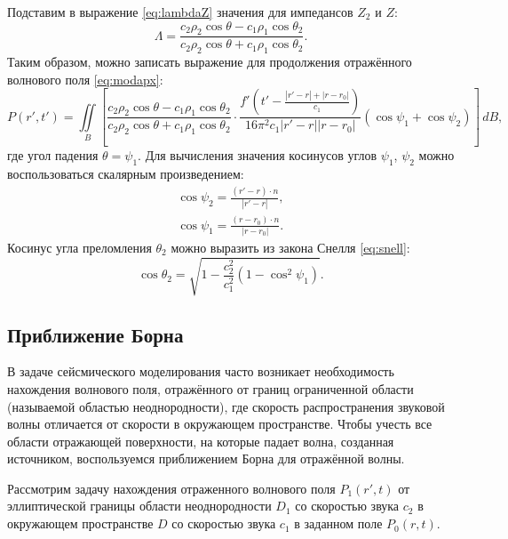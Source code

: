 \documentclass[a4paper, fontsize=14pt]{article}
\begin{document}
	Подставим в выражение \eqref{eq:lambdaZ} значения для импедансов $Z_2$ и $Z$:
	\begin{equation}
		\Lambda = \frac{c_2 \rho_2 \cos \theta - c_1 \rho_1 \cos \theta_2}{c_2 \rho_2 \cos \theta + c_1 \rho_1 \cos \theta_2}.
		\label{eq:lambda}
	\end{equation}
	Таким образом, можно записать выражение для продолжения отражённого волнового поля \eqref{eq:modapx}:
	\begin{equation}
		P(r',t') = \iint\limits_{B} \left[ \frac{c_2 \rho_2 \cos \theta - c_1 \rho_1 \cos \theta_2}{c_2 \rho_2 \cos \theta + c_1 \rho_1 \cos \theta_2} \cdot \frac{f'\left(t'-\frac{|r'-r|+|r-r_0|}{c_1}\right) }{16\pi^2c_1|r'-r||r-r_0|} (\cos \psi_1 + \cos \psi_2) \right] \,dB,
	\end{equation}
	где угол падения $\theta=\psi_1$.
	Для вычисления значения косинусов углов $\psi_1$, $\psi_2$ можно воспользоваться скалярным произведением:
	\begin{gather}
		\cos \psi_2=\frac{(r'-r)\cdot n }{|r'-r|}, \\
		\cos \psi_1 = \frac{(r-r_0)\cdot n }{|r-r_0|}.  \label{eq:cosincident}
	\end{gather}
	Косинус угла преломления $\theta_2$ можно выразить из закона Снелля \eqref{eq:snell}:
	\begin{equation}
		\cos \theta_2 =  \sqrt{1-\frac{c_2^2}{c_1^2}(1-\cos^2 \psi_1)}.
	\end{equation}


	
	

	
	\subsection{Приближение Борна}
	В задаче сейсмического моделирования часто возникает необходимость нахождения волнового поля, отражённого от границ ограниченной области (называемой областью неоднородности), где скорость распространения звуковой волны отличается от скорости в окружающем пространстве. Чтобы учесть все области отражающей поверхности, на которые падает волна, созданная источником, воспользуемся приближением Борна для отражённой волны.\cite{zhdanov2007}
	
	Рассмотрим задачу нахождения отраженного волнового поля $P_1(r',t)$ от эллиптической границы области неоднородности $D_1$ со скоростью звука  $c_2$ в окружающем пространстве $D$ со скоростью звука $c_1$ в заданном поле $P_0(r,t)$. 
	
\end{document}
